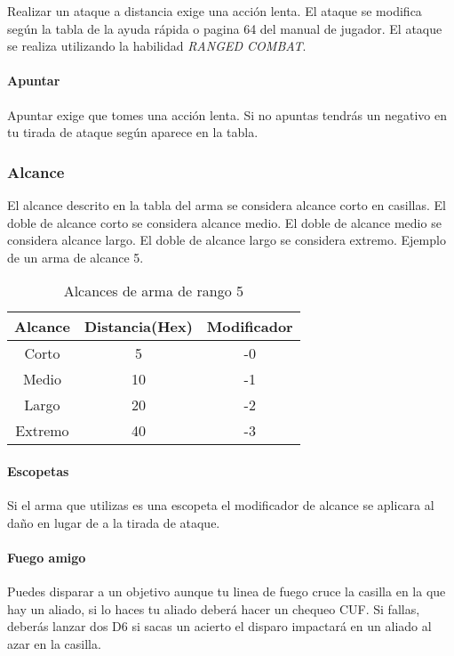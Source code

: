 Realizar un ataque a distancia exige una acción lenta. El ataque se modifica según la tabla de la ayuda rápida o pagina 64 del manual de jugador. El ataque se realiza utilizando la habilidad \emph{RANGED COMBAT}.

\paragraph{Apuntar}
Apuntar exige que tomes una acción lenta. Si no apuntas tendrás un negativo en tu tirada de ataque según aparece en la tabla.

\subsubsection{Alcance}
El alcance descrito en la tabla del arma se considera alcance corto en casillas. El doble de alcance corto se considera alcance medio. El doble de alcance medio se considera alcance largo. El doble de alcance largo se considera extremo. Ejemplo de un arma de alcance 5.

\begin{table}
    \centering
    \begin{tabular}{ c c c }
        \hline
        Alcance & Distancia(Hex) & Modificador \\
        \hline
        Corto & 5 & -0 \\
        Medio & 10 & -1 \\
        Largo & 20 & -2 \\
        Extremo & 40 & -3 \\
        \hline
    \end{tabular}
    \caption{Alcances de arma de rango 5}
    \label{table:2}
\end{table}

\paragraph{Escopetas}
Si el arma que utilizas es una escopeta el modificador de alcance se aplicara al daño en lugar de a la tirada de ataque.

\paragraph{Fuego amigo}
Puedes disparar a un objetivo aunque tu linea de fuego cruce la casilla en la que hay un aliado, si lo haces tu aliado deberá hacer un chequeo CUF. Si fallas, deberás lanzar dos D6 si sacas un acierto el disparo impactará en un aliado al azar en la casilla.

